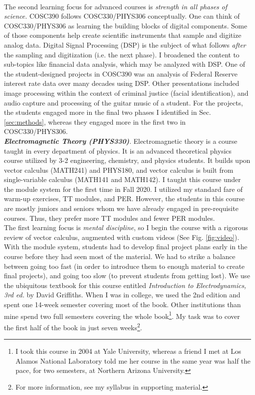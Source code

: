 \documentclass[../../../main.tex]{subfiles}
\begin{document}
\\
\vspace{0.25cm}
The second learning focus for advanced courses is \textit{strength in all phases of science.}  COSC390 follows COSC330/PHYS306 conceptually.  One can think of COSC330/PHYS306 as learning the building blocks of digital components.  Some of those components help create scientific instruments that sample and digitize analog data.  Digital Signal Processing (DSP) is the subject of what follows \textit{after} the sampling and digitization (i.e. the next phase).  I broadened the content to sub-topics like financial data analysis, which may be analyzed with DSP.  One of the student-designed projects in COSC390 was an analysis of Federal Reserve interest rate data over many decades using DSP.  Other presentations included image processing within the context of criminal justice (facial identification), and audio capture and processing of the guitar music of a student.  For the projects, the students engaged more in the final two phases I identified in Sec. \ref{sec:methods}, whereas they engaged more in the first two in COSC330/PHYS306.
\\
\vspace{0.25cm}
\textbf{\textit{Electromagnetic Theory (PHYS330)}}.  Electromagnetic theory is a course taught in every department of physics.  It is an advanced theoretical physics course utilized by 3-2 engineering, chemistry, and physics students.  It builds upon vector calculus (MATH241) and PHYS180, and vector calculus is built from single-variable calculus (MATH141 and MATH142).  I taught this course under the module system for the first time in Fall 2020.  I utilized my standard fare of warm-up exercises, TT modules, and PER.  However, the students in this course are mostly juniors and seniors whom we have already engaged in pre-requisite courses.  Thus, they prefer more TT modules and fewer PER modules.
\\
\vspace{0.25cm}
The first learning focus is \textit{mental discipline}, so I begin the course with a rigorous review of vector calculus, augmented with custom videos (See Fig. \ref{fig:video}).  With the module system, students had to develop final project plans early in the course before they had seen most of the material.  We had to strike a balance between going too fast (in order to introduce them to enough material to create final projects), and going too slow (to prevent students from getting lost).  We use the ubiquitous textbook for this course entitled \textit{Introduction to Electrodynamics, 3rd ed.} by David Griffiths.  When I was in college, we used the 2nd edition and spent one 14-week semester covering most of the book.  Other institutions than mine spend two full semesters covering the whole book\footnote{I took this course in 2004 at Yale University, whereas a friend I met at Los Alamos National Laboratory told me her course in the same year was half the pace, for two semesters, at Northern Arizona University.}.  My task was to cover the first half of the book in just seven weeks\footnote{For more information, see my syllabus in supporting material.}.
\end{document}
